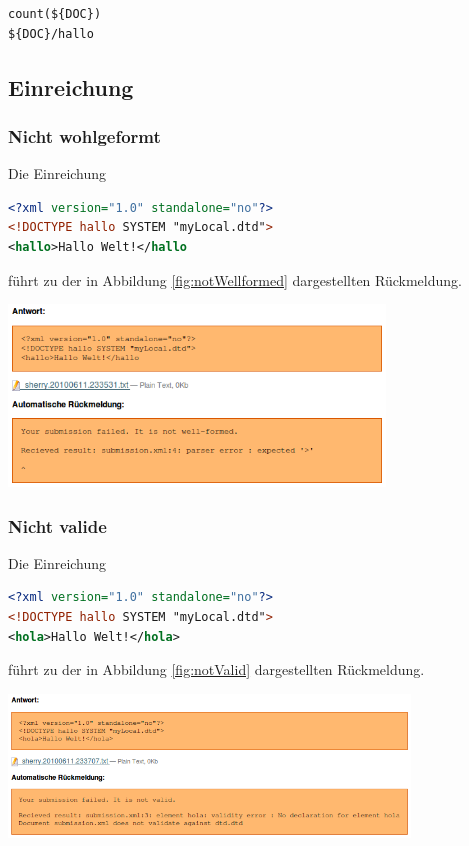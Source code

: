 \documentclass[a4paper]{scrartcl}
\begin{document}
\begin{lstlisting}[language=XML, captionpos=b, frame=tlRB, caption={Beispiel XPath-Ausdrücke.}]
count(${DOC})
${DOC}/hallo
\end{lstlisting}
	  
	  \subsection{Einreichung}
  	  \subsubsection{Nicht wohlgeformt}
  	  Die Einreichung
  	  \begin{lstlisting}[language=XML, captionpos=b, frame=tlRB, caption={Nicht wohlgeformte Einreichung.}]
<?xml version="1.0" standalone="no"?>
<!DOCTYPE hallo SYSTEM "myLocal.dtd">
<hallo>Hallo Welt!</hallo
\end{lstlisting}
  	  führt zu der in Abbildung \ref{fig:notWellformed} dargestellten Rückmeldung.
  	  \begin{center}
        \captionsetup{type=figure}
	      \includegraphics[width=0.75\textwidth]{images/notWellformed.png}
	      \label{fig:notWellformed}
      \end{center}
  	  
  	  \subsubsection{Nicht valide}
  	  Die Einreichung
  	  \begin{lstlisting}[language=XML, captionpos=b, frame=tlRB, caption={Nicht valide Einreichung.}]
<?xml version="1.0" standalone="no"?>
<!DOCTYPE hallo SYSTEM "myLocal.dtd">
<hola>Hallo Welt!</hola>
\end{lstlisting}
  	  führt zu der in Abbildung \ref{fig:notValid} dargestellten Rückmeldung.
  	  \begin{center}
        \captionsetup{type=figure}
	      \includegraphics[width=0.8\textwidth]{images/notValid.png}
	      \label{fig:notValid}
      \end{center}
      
\end{document}

